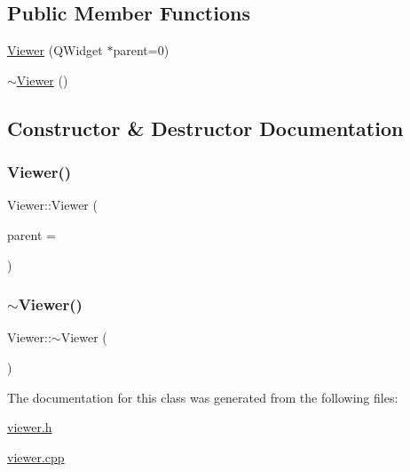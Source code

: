 \subsection*{Public Member Functions}
\begin{DoxyCompactItemize}
\item 
\hyperlink{class_viewer_a6a1f845092e1d4407adabb550e40431b}{Viewer} (Q\+Widget $\ast$parent=0)
\item 
\hyperlink{class_viewer_a324e5a6a1532fe5eac3f3b0e4792b2da}{$\sim$\+Viewer} ()
\end{DoxyCompactItemize}


\subsection{Constructor \& Destructor Documentation}
\hypertarget{class_viewer_a6a1f845092e1d4407adabb550e40431b}{}\label{class_viewer_a6a1f845092e1d4407adabb550e40431b} 
\subsubsection{\texorpdfstring{Viewer()}{Viewer()}}
{\footnotesize\ttfamily Viewer\+::\+Viewer (\begin{DoxyParamCaption}\item[{Q\+Widget $\ast$}]{parent = {} }\end{DoxyParamCaption})\hspace{0.3cm}{\ttfamily [explicit]}}

\hypertarget{class_viewer_a324e5a6a1532fe5eac3f3b0e4792b2da}{}\label{class_viewer_a324e5a6a1532fe5eac3f3b0e4792b2da} 
\subsubsection{\texorpdfstring{$\sim$\+Viewer()}{~Viewer()}}
{\footnotesize\ttfamily Viewer\+::$\sim$\+Viewer (\begin{DoxyParamCaption}{ }\end{DoxyParamCaption})}



The documentation for this class was generated from the following files\+:\begin{DoxyCompactItemize}
\item 
\hyperlink{viewer_8h}{viewer.\+h}\item 
\hyperlink{viewer_8cpp}{viewer.\+cpp}\end{DoxyCompactItemize}
